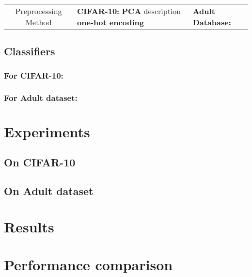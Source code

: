\documentclass{article}
\begin{document}
\begin{table}[!h]
\begin{tabular}{| c | L{5cm} | L{5cm} | }
Preprocessing Method &
\textbf{CIFAR-10:}\newline 
\textbf{PCA} description\newline
 \textbf{one-hot encoding}   
    
    
    
    
    
    
    
    
    
& \textbf{Adult Database:}\newline  \\
\end{tabular}

\end{table}
  



\subsection{Classifiers}
\subsubsection{For CIFAR-10:}

\subsubsection{For Adult dataset:}








\section{Experiments}
\subsection{On CIFAR-10}
\subsection{On Adult dataset}


\section{Results}

\section{Performance comparison}
\label{others}
\end{document}
